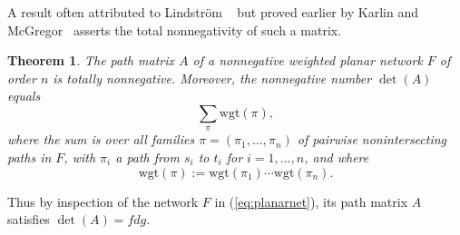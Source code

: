 \documentclass[12pt]{amsart}
\newtheorem{thm}{Theorem}[section]
\numberwithin{equation}{section}
\newcommand{\defeq}{:=}
\newcommand{\wgt}{\mathrm{wgt}}
\begin{document}
A result often attributed to Lindstr\"om
~\cite{LinVrep} but proved earlier by Karlin and McGregor~\cite{KMG}
asserts the total nonnegativity of such a matrix.
\begin{thm}\label{t:lin}
  The path matrix $A$ of a nonnegative weighted planar network $F$ of order $n$
  is totally nonnegative.  Moreover,
  the nonnegative number $\det(A)$ equals
  \begin{equation*}
    \sum_\pi \wgt(\pi),
  \end{equation*}
  where the sum is over all families $\pi = (\pi_1,\dotsc,\pi_n)$
  of pairwise nonintersecting paths in $F$,
  with $\pi_i$ a path from $s_i$ to $t_i$ for $i = 1,\dotsc,n$, and where
  \begin{equation}\label{eq:wgt}
    \wgt(\pi) \defeq \wgt(\pi_1) \cdots \wgt(\pi_n).
    \end{equation}
\end{thm}

\noindent
Thus by inspection of the network $F$ in (\ref{eq:planarnet}),
its path matrix $A$ satisfies $\det(A) = fdg$.
\end{document}
